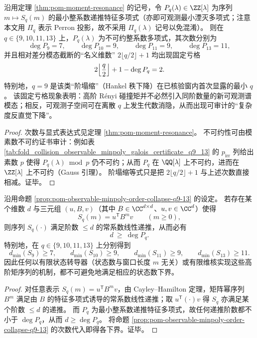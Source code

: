 \begin{proposition}[可观测最小多项式的非线性阶塌缩：\texorpdfstring{$q=9,10,11,13$}{q=9,10,11,13} 首次出现固定亏格（可审计）]\label{prop:pom-observable-minpoly-order-collapse-q9-13}
沿用定理 \ref{thm:pom-moment-resonance} 的记号，令 \(P_q(\lambda)\in\ZZ[\lambda]\) 为序列 \(m\mapsto S_q(m)\) 的最小整系数递推特征多项式（亦即可观测最小湮灭多项式；注意本文用 \(\Pi_q\) 表示 Perron 投影，故不采用 \(\Pi_q(\lambda)\) 记号以免混淆）。
则在 \(q\in\{9,10,11,13\}\) 上，\(P_q(\lambda)\) 为不可约整系数多项式，其次数分别为
\[
\deg P_9=7,\qquad \deg P_{10}=9,\qquad \deg P_{11}=9,\qquad \deg P_{13}=11,
\]
并且相对差分模态截断的“名义维数” \(2\lfloor q/2\rfloor+1\) 均出现固定亏格
\[
2\Bigl\lfloor\frac{q}{2}\Bigr\rfloor+1-\deg P_q=2.
\]
特别地，\(q=9\) 是该类“阶塌缩”（Hankel 秩下降）在已核验窗内首次显露的最小 \(q\)。
该固定亏格现象表明：高阶 Rényi 碰撞矩并不必然引入同阶数量的新可观测谱模态；相反，可观测子空间可在离散 \(q\) 上发生代数消隐，从而出现可审计的“复杂度反直觉下降”。
\end{proposition}
\begin{proof}
次数与显式表达式见定理 \ref{thm:pom-moment-resonance}。
不可约性可由模素数不可约证书审计：例如表 \ref{tab:fold_collision_observable_minpoly_galois_certificate_q9_13} 的 \(p_{\mathrm{irr}}\) 列给出素数 \(p\) 使得 \(P_q(\lambda)\bmod p\) 仍不可约；从而 \(P_q\) 在 \(\QQ[\lambda]\) 上不可约，进而在 \(\ZZ[\lambda]\) 上不可约（Gauss 引理）。
阶塌缩等式只是把 \(2\lfloor q/2\rfloor+1\) 与上述次数直接相减。证毕。
\end{proof}

\begin{corollary}\label{cor:pom-finite-state-dimension-lower-bound-from-minpoly}
沿用命题 \ref{prop:pom-observable-minpoly-order-collapse-q9-13} 的设定。
若存在某个维数 \(d\) 与三元组 \((u,B,v)\)（其中 \(B\in\CC^{d\times d}\)、\(u,v\in\CC^{d}\)）使得
\[
S_q(m)=u^{\mathsf T}B^m v\qquad(m\ge 0),
\]
则序列 \(S_q(\cdot)\) 满足阶数 \(\le d\) 的常系数线性递推，从而必有
\[
d\ \ge\ \deg P_q.
\]
特别地，在 \(q\in\{9,10,11,13\}\) 上分别得到
\[
d_{\min}(S_9)\ge 7,\qquad
d_{\min}(S_{10})\ge 9,\qquad
d_{\min}(S_{11})\ge 9,\qquad
d_{\min}(S_{13})\ge 11.
\]
因此任何以有限状态转导器（状态数与窗口长度 \(m\) 无关）或有限维核实现这些高阶矩序列的机制，都不可避免地满足相应的状态数下界。
\end{corollary}
\begin{proof}
对任意表示 \(S_q(m)=u^{\mathsf T}B^m v\)，由 Cayley--Hamilton 定理，矩阵幂序列 \(B^m\) 满足由 \(B\) 的特征多项式诱导的常系数线性递推；取 \(u^{\mathsf T}(\cdot)v\) 得 \(S_q\) 亦满足某个阶数 \(\le d\) 的递推。
而 \(P_q\) 为最小整系数递推特征多项式，故任何递推阶数都不小于 \(\deg P_q\)，从而 \(d\ge \deg P_q\)。
将命题 \ref{prop:pom-observable-minpoly-order-collapse-q9-13} 的次数代入即得各下界。证毕。
\end{proof}

